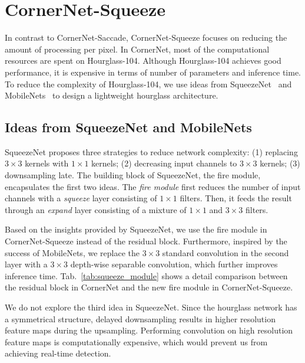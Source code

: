 \documentclass{bmvc2k}
\begin{document}
\section{CornerNet-Squeeze}
In contrast to CornerNet-Saccade, CornerNet-Squeeze focuses on reducing the amount of processing per pixel. In CornerNet, most of the computational resources are spent on Hourglass-104. Although Hourglass-104 achieves good performance, it is expensive in terms of number of parameters and inference time. To reduce the complexity of Hourglass-104, we use ideas from SqueezeNet~\cite{iandola2016squeezenet} and MobileNets~\cite{howard2017mobilenets} to design a lightweight hourglass architecture.

\subsection{Ideas from SqueezeNet and MobileNets}
SqueezeNet proposes three strategies to reduce network complexity: (1) replacing $3 \times 3$ kernels with $1 \times 1$ kernels; (2) decreasing input channels to $3 \times 3$ kernels; (3) downsampling late. The building block of SqueezeNet, the fire module, encapsulates the first two ideas. The \textit{fire module} first reduces the number of input channels with a \textit{squeeze} layer consisting of $1 \times 1$ filters. Then, it feeds the result through an \textit{expand} layer consisting of a mixture of $1 \times 1$ and $3 \times 3$ filters.

Based on the insights provided by SqueezeNet, we use the fire module in CornerNet-Squeeze instead of the residual block. Furthermore, inspired by the success of MobileNets, we replace the $3 \times 3$ standard convolution in the second layer with a $3 \times 3$ depth-wise separable convolution, which further improves inference time. Tab.~\ref{tab:squeeze_module} shows a detail comparison between the residual block in CornerNet and the new fire module in CornerNet-Squeeze. 

We do not explore the third idea in SqueezeNet. Since the hourglass network has a symmetrical structure, delayed downsampling results in higher resolution feature maps during the upsampling. Performing convolution on high resolution feature maps is computationally expensive, which would prevent us from achieving real-time detection.
\end{document}
